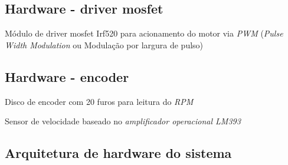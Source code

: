\documentclass[times, twoside, watermark]{artigo}
\begin{document}
\subsection{Hardware - driver mosfet}
Módulo de driver mosfet Irf520 para acionamento do motor via \textit{PWM} (\textit{Pulse Width Modulation} ou Modulação por largura de pulso)




\subsection{Hardware - encoder}
Disco de encoder com 20 furos para leitura do \textit{RPM} 


Sensor de velocidade baseado no \textit{amplificador operacional LM393}



\subsection{Arquitetura de hardware do sistema}
\end{document}
